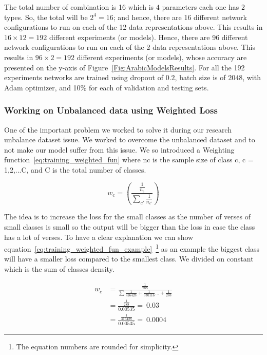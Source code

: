 The total number of combination is 16 which is $4$ parameters each one has $2$ types. So, the total will be $2^4=16$; and hence, there are 16 different network configurations to run on each of the 12 data representations above. This results in $16 \times 12 = 192$ different experiments (or models). Hence, there are 96 different network configurations to run on each of the 2 data representations above. This results in $96 \times 2 = 192$ different experiments (or models), whose accuracy are presented on the y-axis of Figure~\ref{Fig:ArabicModelsResults}. For all the 192 experiments networks are trained using dropout of $0.2$, batch size is of $2048$, with Adam optimizer, and 10\% for each of validation and testing sets.


\subsubsection{Working on Unbalanced data using Weighted Loss}\label{Sec:W_Loss}

One of the important problem we worked to solve it during our research unbalance dataset issue. We worked to overcome the unbalanced dataset and to not make our model suffer from this issue. We so introduced a Weighting function~\ref{eq:training_weighted_fun} where nc is the sample size of class c, c = 1,2,...C, and C
is the total number of classes.

\begin{equation}\label{eq:training_weighted_fun}
  w_c = \left(\frac{\frac{1}{n_c}}{\sum_{c'} \frac{1}{n_{c'}}} \right)
\end{equation}

The idea is to increase the loss for the small classes as the number of verses of small classes is small so the output will be bigger than the loss in case the class has a lot of verses. To have a clear explanation we can show equation~\ref{eq:training_weighted_fun_example}~\footnote{The equation numbers are rounded for simplicity.} as an example the biggest class will have a smaller loss compared to the smallest class. We divided on constant which is the sum of classes density. 

\begin{subequations}
  \begin{align}
    w_c &=  \frac{\frac{1}{288}}{\sum\frac{1}{416428}+\frac{1}{370116}\dots+\frac{1}{288}}\\
       &= \frac{\frac{1}{288}}{0.00535} = ~0.03 \\
       &= \frac{\frac{1}{416428}}{0.00535} = ~0.0004
  \end{align}\label{eq:training_weighted_fun_example}
\end{subequations}

